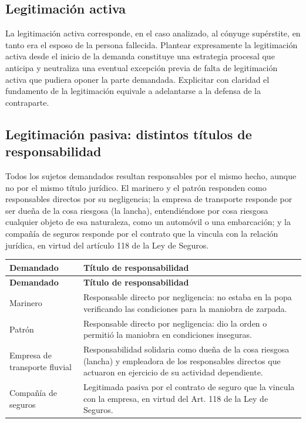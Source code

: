 \documentclass[12pt,oneside]{book}
\begin{document}
\subsection{Legitimación activa}

La legitimación activa corresponde, en el caso analizado, al cónyuge supérstite, en tanto era el esposo de la persona fallecida. Plantear expresamente la legitimación activa desde el inicio de la demanda constituye una estrategia procesal que anticipa y neutraliza una eventual excepción previa de falta de legitimación activa que pudiera oponer la parte demandada. Explicitar con claridad el fundamento de la legitimación equivale a adelantarse a la defensa de la contraparte.

\subsection{Legitimación pasiva: distintos títulos de responsabilidad}

Todos los sujetos demandados resultan responsables por el mismo hecho, aunque no por el mismo título jurídico. El marinero y el patrón responden como responsables directos por su negligencia; la empresa de transporte responde por ser dueña de la cosa riesgosa (la lancha), entendiéndose por cosa riesgosa cualquier objeto de esa naturaleza, como un automóvil o una embarcación; y la compañía de seguros responde por el contrato que la vincula con la relación jurídica, en virtud del artículo 118 de la Ley de Seguros.

\begin{longtable}{>{\raggedright\arraybackslash}p{} >{\raggedright\arraybackslash}p{}}
\toprule
\textbf{Demandado} & \textbf{Título de responsabilidad} \\
\midrule
\endfirsthead
\toprule
\textbf{Demandado} & \textbf{Título de responsabilidad} \\
\midrule
\endhead
Marinero & Responsable directo por negligencia: no estaba en la popa verificando las condiciones para la maniobra de zarpada. \\
Patrón & Responsable directo por negligencia: dio la orden o permitió la maniobra en condiciones inseguras. \\
Empresa de transporte fluvial & Responsabilidad solidaria como dueña de la cosa riesgosa (lancha) y empleadora de los responsables directos que actuaron en ejercicio de su actividad dependiente. \\
Compañía de seguros & Legitimada pasiva por el contrato de seguro que la vincula con la empresa, en virtud del Art. 118 de la Ley de Seguros. \\
\bottomrule
\end{longtable}
\end{document}
